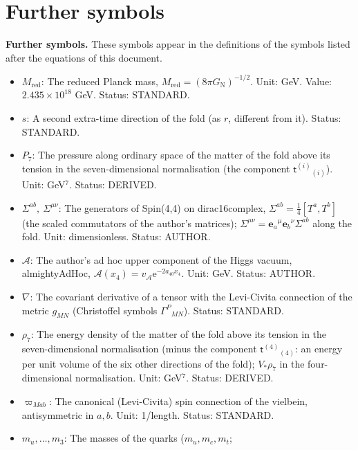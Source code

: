 \documentclass[
  10pt,
]{article}
\providecommand{\tightlist}{%
  \setlength{\itemsep}{0pt}\setlength{\parskip}{0pt}}
\begin{document}
\hypertarget{further-symbols}{%
\section{Further symbols}\label{further-symbols}}

\textbf{Further symbols.} These symbols appear in the definitions of the
symbols listed after the equations of this document.

\begin{itemize}
\tightlist
\item
  \(M_{\mathrm{red}}\): The reduced Planck mass,
  \(M_{\mathrm{red}} = (8\pi G_{\mathrm{N}})^{-1/2}\). Unit: GeV. Value:
  \(2.435\times10^{18}\) GeV. Status: STANDARD.
\item
  \(s\): A second extra-time direction of the fold (as \(r\), different
  from it). Status: STANDARD.
\item
  \(P_7\): The pressure along ordinary space of the matter of the fold
  above its tension in the seven-dimensional normalisation (the
  component \(\mathsf{t}^{(i)}{}_{(i)}\)). Unit: GeV\(^7\). Status:
  DERIVED.
\item
  \(\Sigma^{ab},\ \Sigma^{\mu\nu}\): The generators of Spin(4,4) on
  dirac16complex, \(\Sigma^{ab} = \frac14[T^a, T^b]\) (the scaled
  commutators of the author's matrices);
  \(\Sigma^{\mu\nu} = \mathbf{e}_a{}^\mu\mathbf{e}_b{}^\nu\Sigma^{ab}\)
  along the fold. Unit: dimensionless. Status: AUTHOR.
\item
  \(\mathcal{A}\): The author's ad hoc upper component of the Higgs
  vacuum, almightyAdHoc,
  \(\mathcal{A}(x_4) = v_{\mathcal{A}}\mathrm{e}^{-2a_{40}x_4}\). Unit:
  GeV. Status: AUTHOR.
\item
  \(\nabla\): The covariant derivative of a tensor with the Levi-Civita
  connection of the metric \(g_{MN}\) (Christoffel symbols
  \(\Gamma^P{}_{MN}\)). Status: STANDARD.
\item
  \(\rho_7\): The energy density of the matter of the fold above its
  tension in the seven-dimensional normalisation (minus the component
  \(\mathsf{t}^{(4)}{}_{(4)}\): an energy per unit volume of the six
  other directions of the fold); \(V_*\rho_7\) in the four-dimensional
  normalisation. Unit: GeV\(^7\). Status: DERIVED.
\item
  \(\varpi_{Mab}\): The canonical (Levi-Civita) spin connection of the
  vielbein, antisymmetric in \(a, b\). Unit: 1/length. Status: STANDARD.
\item
  \(m_u, \dots, m_3\): The masses of the quarks (\(m_u, m_c, m_t\);

\end{itemize}
\end{document}
